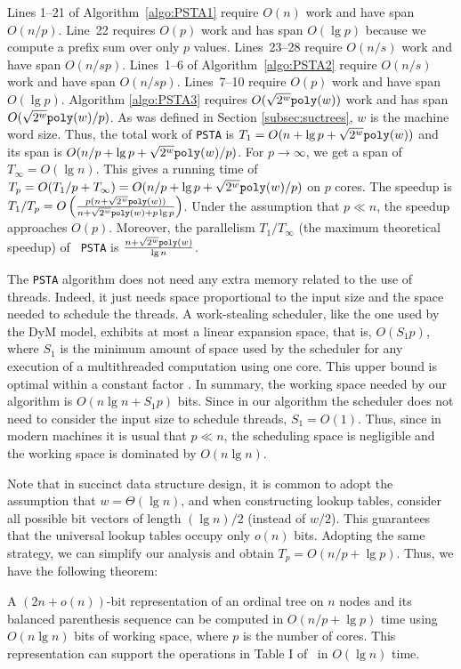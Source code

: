 Lines 1--21 of Algorithm~\ref{algo:PSTA1} require $O(n)$ work and have
span~$O(n/p)$.
Line~22 requires $O(p)$ work and has span $O(\lg p)$ because we compute
a prefix sum over only $p$ values.
Lines~23--28 require $O(n/s)$ work and have span $O(n/sp)$.
Lines~1--6 of Algorithm~\ref{algo:PSTA2} require $O(n/s)$ work and have
span $O(n/sp)$.
Lines~7--10 require $O(p)$ work and have span $O(\lg p)$.
Algorithm \ref{algo:PSTA3} requires $O(\sqrt{2^w}\mathtt{poly}(w))$ work and
has span $O(\sqrt{2^{w}}\mathtt{poly}(w)/p)$. As was defined in Section \ref{subsec:suctrees},
$w$ is the machine word size.
Thus, the total work of {\tt PSTA} is $T_1 = O(n + \lg p + \sqrt{2^w}\mathtt{poly}(w))$
and its span is $O(n/p + \lg p + \sqrt{2^w}\mathtt{poly}(w)/p)$.
For $p \rightarrow \infty$, we get a span of $T_\infty = O(\lg n)$.
This gives a running time of $T_p = O(T_1/p + T_\infty) =
O(n/p + \lg p + \sqrt{2^w}\mathtt{poly}(w)/p)$ on $p$ cores.
The speedup is $T_1/T_p = O\left(\frac{p(n+\sqrt{2^{w}}\mathtt{poly}(w))}{n+\sqrt{2^{w}}\mathtt{poly}(w)+p\lg
p}\right)$. Under the assumption that $p\ll n$, the speedup approaches
$O(p)$. Moreover, the
parallelism $T_1/T_{\infty}$ (the maximum theoretical speedup) of {\tt
PSTA} is $\frac{n+\sqrt{2^{w}}\mathtt{poly}(w)}{\lg n}$.

The {\tt PSTA} algorithm does not need any extra memory related to the use of
threads. Indeed, it just needs space proportional to the input size
and the space needed to schedule the threads. A work-stealing
scheduler, like the one used by the DyM model, exhibits at most a
linear expansion space, that is, $O(S_1p)$, where $S_1$ is the minimum
amount of space used by the scheduler for any execution of a
multithreaded computation using one core. This upper bound is
optimal within a constant factor
\cite{Blumofe:1999:SMC:324133.324234}. In summary, the working space
needed by our algorithm is $O(n\lg n+S_1p)$ bits. Since in our
algorithm the scheduler does not need to consider the input
size to schedule threads, $S_1=O(1)$. Thus, since in modern
machines it is usual that $p\ll n$, the scheduling space is negligible
and the working space is dominated by $O(n\lg n)$.

Note that in succinct data structure design, it is common to adopt the assumption that $w = \Theta(\lg n)$, and when constructing lookup tables, consider all possible bit vectors of length $(\lg n)/2$ (instead of $w/2$).
This guarantees that the universal lookup tables occupy only $o(n)$ bits.
Adopting the same strategy, we can simplify our analysis and obtain
$T_p = O(n/p + \lg p)$.
Thus, we have the following theorem:
\begin{theorem}\label{lem:lg}
A $(2n+o(n))$-bit representation of an ordinal tree on $n$ nodes and its balanced parenthesis sequence can be computed in $O(n/p + \lg p)$ time using $O(n\lg n)$ bits of working space, where $p$ is the number of cores.
This representation can support the operations in Table I of~\cite{Navarro:2014:FFS:2620785.2601073} in $O(\lg n)$ time.
\end{theorem}
